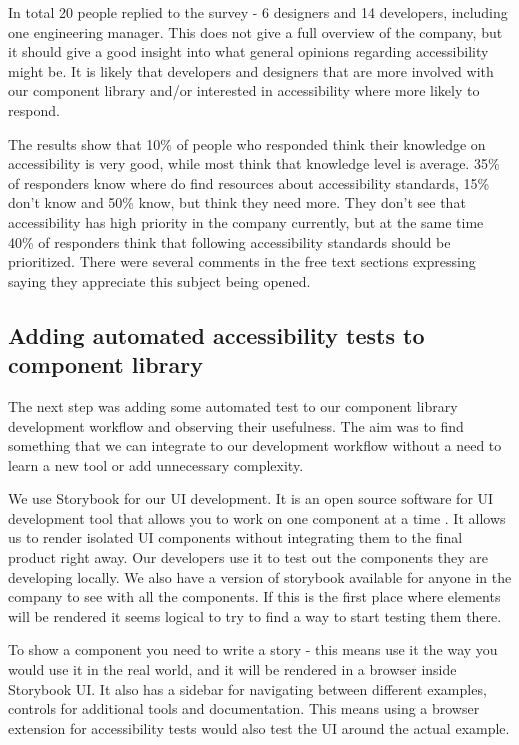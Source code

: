 \documentclass{master_thesis}
\begin{document}
In total 20 people replied to the survey - 6 designers and 14 developers, including one engineering manager. This does not give a full overview of the company, but it should give a good insight into what general opinions regarding accessibility might be. It is likely that developers and designers that are more involved with our component library and/or interested in accessibility where more likely to respond.

The results show that 10\% of people who responded think their knowledge on accessibility is very good, while most think that knowledge level is average. 35\% of responders know where do find resources about accessibility standards, 15\% don't know and 50\% know, but think they need more. They don't see that accessibility has high priority in the company currently, but at the same time 40\% of responders think that following accessibility standards should be prioritized. There were several comments in the free text sections expressing saying they appreciate this subject being opened.

\subsection{Adding automated accessibility tests to component library}
The next step was adding some automated test to our component library development workflow and observing their usefulness. The aim was to find something that we can integrate to our development workflow without a need to learn a new tool or add unnecessary complexity.

We use Storybook for our UI development. It is an open source software for UI development tool that allows you to work on one component at a time \citep{storybook}. It allows us to render isolated UI components without integrating them to the final product right away. Our developers use it to test out the components they are developing locally. We also have a version of storybook available for anyone in the company to see with all the components. If this is the first place where elements will be rendered it seems logical to try to find a way to start testing them there.

To show a component you need to write a story - this means use it the way you would use it in the real world, and it will be rendered in a browser inside Storybook UI. It also has a sidebar for navigating between different examples, controls for additional tools and documentation. This means using a browser extension for accessibility tests would also test the UI around the actual example.
\end{document}

